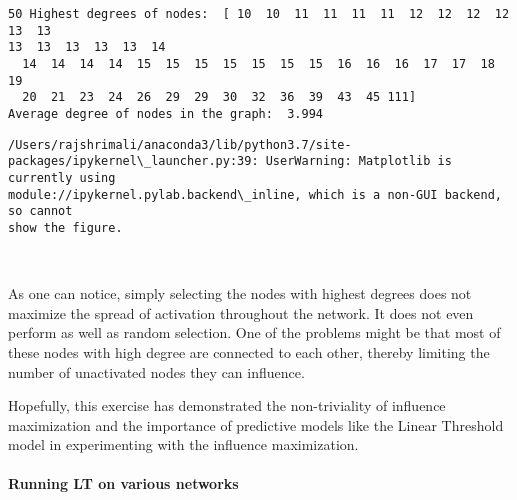 \documentclass[11pt]{article}
\begin{document}
    \begin{Verbatim}[commandchars=\\\{\}]
50 Highest degrees of nodes:  [ 10  10  11  11  11  11  12  12  12  12  13  13
13  13  13  13  13  14
  14  14  14  14  15  15  15  15  15  15  15  16  16  16  17  17  18  19
  20  21  23  24  26  29  29  30  32  36  39  43  45 111]
Average degree of nodes in the graph:  3.994
    \end{Verbatim}

    \begin{Verbatim}[commandchars=\\\{\}]
/Users/rajshrimali/anaconda3/lib/python3.7/site-
packages/ipykernel\_launcher.py:39: UserWarning: Matplotlib is currently using
module://ipykernel.pylab.backend\_inline, which is a non-GUI backend, so cannot
show the figure.
    \end{Verbatim}

    \begin{center}
    \end{center}
    { \hspace*{\fill} \\}
    
    As one can notice, simply selecting the nodes with highest degrees does
not maximize the spread of activation throughout the network. It does
not even perform as well as random selection. One of the problems might
be that most of these nodes with high degree are connected to each
other, thereby limiting the number of unactivated nodes they can
influence.

Hopefully, this exercise has demonstrated the non-triviality of
influence maximization and the importance of predictive models like the
Linear Threshold model in experimenting with the influence maximization.

    \hypertarget{running-lt-on-various-networks}{%
\paragraph{Running LT on various
networks}\label{running-lt-on-various-networks}}
\end{document}
